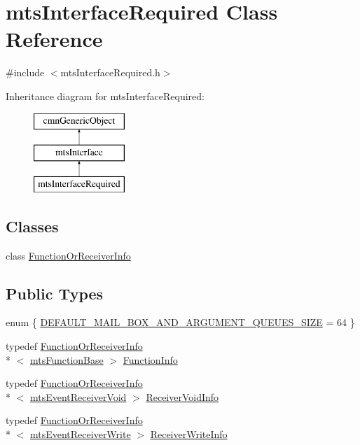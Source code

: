 \hypertarget{classmts_interface_required}{\section{mts\-Interface\-Required Class Reference}
\label{classmts_interface_required}
}


{\ttfamily \#include $<$mts\-Interface\-Required.\-h$>$}

Inheritance diagram for mts\-Interface\-Required\-:\begin{figure}[H]
\begin{center}
\leavevmode
\includegraphics[height=3.000000cm]{d8/d64/classmts_interface_required}
\end{center}
\end{figure}
\subsection*{Classes}
\begin{DoxyCompactItemize}
\item 
class \hyperlink{classmts_interface_required_1_1_function_or_receiver_info}{Function\-Or\-Receiver\-Info}
\end{DoxyCompactItemize}
\subsection*{Public Types}
\begin{DoxyCompactItemize}
\item 
enum \{ \hyperlink{classmts_interface_required_afd977b8e5e4045ee10a68ff31e16a852a8b550bffbc9fcc1c50e42b45d36eaaec}{D\-E\-F\-A\-U\-L\-T\-\_\-\-M\-A\-I\-L\-\_\-\-B\-O\-X\-\_\-\-A\-N\-D\-\_\-\-A\-R\-G\-U\-M\-E\-N\-T\-\_\-\-Q\-U\-E\-U\-E\-S\-\_\-\-S\-I\-Z\-E} = 64
 \}
\item 
typedef \hyperlink{classmts_interface_required_1_1_function_or_receiver_info}{Function\-Or\-Receiver\-Info}\\*
$<$ \hyperlink{classmts_function_base}{mts\-Function\-Base} $>$ \hyperlink{classmts_interface_required_ade456f015f7ec3569d23f4a29a147ede}{Function\-Info}
\item 
typedef \hyperlink{classmts_interface_required_1_1_function_or_receiver_info}{Function\-Or\-Receiver\-Info}\\*
$<$ \hyperlink{classmts_event_receiver_void}{mts\-Event\-Receiver\-Void} $>$ \hyperlink{classmts_interface_required_a7ddf0b5c0205b5a512562171275ff1c3}{Receiver\-Void\-Info}
\item 
typedef \hyperlink{classmts_interface_required_1_1_function_or_receiver_info}{Function\-Or\-Receiver\-Info}\\*
$<$ \hyperlink{classmts_event_receiver_write}{mts\-Event\-Receiver\-Write} $>$ \hyperlink{classmts_interface_required_a66d230e43ed3c2bb07f0593a997f06cc}{Receiver\-Write\-Info}
\end{DoxyCompactItemize}
